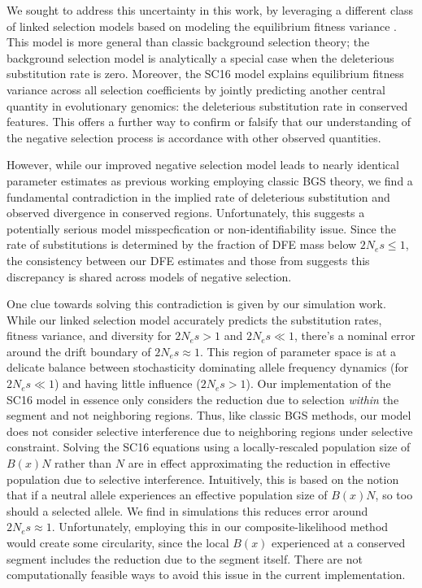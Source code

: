 \documentclass[11pt]{article}
\begin{document}
We sought to address this uncertainty in this work, by leveraging a different
class of linked selection models based on modeling the equilibrium fitness
variance \parencite{Santiago2016-mu}. This model is more general than classic
background selection theory; the background selection model is analytically a
special case when the deleterious substitution rate is zero. Moreover, the SC16
model explains equilibrium fitness variance across all selection coefficients
by jointly predicting another central quantity in evolutionary genomics: the
deleterious substitution rate in conserved features. This offers a further way
to confirm or falsify that our understanding of the negative selection process
is accordance with other observed quantities.

However, while our improved negative selection model leads to nearly identical
parameter estimates as previous working employing classic BGS theory, we find a
fundamental contradiction in the implied rate of deleterious substitution and
observed divergence in conserved regions. Unfortunately, this suggests a
potentially serious model misspecfication or non-identifiability issue. Since
the rate of substitutions is determined by the fraction of DFE mass below $2N_e
s \le 1$, the consistency between our DFE estimates and those from
\textcite{Murphy2022-sj} suggests this discrepancy is shared across models of
negative selection.

One clue towards solving this contradiction is given by our simulation work.
While our linked selection model accurately predicts the substitution rates,
fitness variance, and diversity for $2N_e s > 1$ and $2N_e s \ll 1$, there's a
nominal error around the drift boundary of $2N_e s \approx 1$. This region of
parameter space is at a delicate balance between stochasticity dominating
allele frequency dynamics (for $2N_e s \ll 1$) and having little influence
($2N_e s > 1$). Our implementation of the SC16 model in essence only considers
the reduction due to selection \emph{within} the segment and not neighboring
regions. Thus, like classic BGS methods, our model does not consider selective
interference due to neighboring regions under selective constraint. Solving the
SC16 equations using a locally-rescaled population size of $B(x) N$ rather than
$N$ are in effect approximating the reduction in effective population due to
selective interference. Intuitively, this is based on the notion that if a
neutral allele experiences an effective population size of $B(x)N$, so too
should a selected allele. We find in simulations this reduces error around $2
N_e s \approx 1$. Unfortunately, employing this in our composite-likelihood
method would create some circularity, since the local $B(x)$ experienced at a
conserved segment includes the reduction due to the segment itself. There are
not computationally feasible ways to avoid this issue in the current
implementation.
\end{document}
